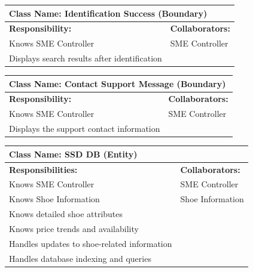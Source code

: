 \documentclass[]{article}
\begin{document}
\begin{table}[H]
    \centering
    \begin{tabular}{|p{}|p{}|}
        \hline
        \multicolumn{2}{|l|}{\textbf{Class Name:} Identification Success (Boundary)} \\
        \hline
        \textbf{Responsibility:} & \textbf{Collaborators:} \\
        \hline
        Knows SME Controller & SME Controller \\
        Displays search results after identification & \\
        \hline
    \end{tabular}
    \label{tab:identification_success}
\end{table}

\begin{table}[H]
    \centering
    \begin{tabular}{|p{}|p{}|}
        \hline
        \multicolumn{2}{|l|}{\textbf{Class Name:} Contact Support Message (Boundary)} \\
        \hline
        \textbf{Responsibility:} & \textbf{Collaborators:} \\
        \hline
        Knows SME Controller & SME Controller \\
        Displays the support contact information &  \\
        \hline
    \end{tabular}
    \label{tab:contact_support_message}
\end{table}

\begin{table}[H]
    \centering
    \begin{tabular}{|p{}|p{}|}
        \hline
        \multicolumn{2}{|l|}{\textbf{Class Name:} SSD DB (Entity)} \\
        \hline
        \textbf{Responsibilities:} & \textbf{Collaborators:} \\
        \hline
        Knows SME Controller & SME Controller \\
        Knows Shoe Information & Shoe Information \\
        Knows detailed shoe attributes & \\  
        Knows price trends and availability & \\  
        Handles updates to shoe-related information & \\   
        Handles database indexing and queries & \\  
        \hline
    \end{tabular}
    \label{tab:ssd_db}
\end{table}
\end{document}
